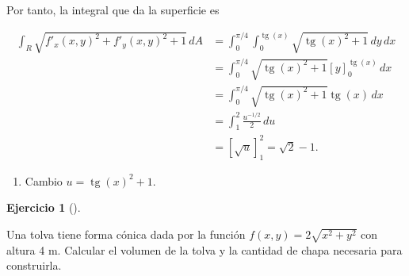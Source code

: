 \documentclass[
  a4paper,
]{scrreport}
\providecommand{\tightlist}{%
  \setlength{\itemsep}{0pt}\setlength{\parskip}{0pt}}\usepackage{longtable,booktabs,array}
\theoremstyle{definition}
\newtheorem{exercise}{Ejercicio}[chapter]
\theoremstyle{remark}
\begin{document}
\begin{tcolorbox}
\begin{enumerate}
  Por tanto, la integral que da la superficie es

  \begin{align*}
  \int_R \sqrt{f'_x(x,y)^2+f'_y(x,y)^2+1}\,dA
  &= \int_{0}^{\pi/4} \int_{0}^{\operatorname{tg}(x)} \sqrt{\operatorname{tg}(x)^2+1}\,dy\,dx \\
  &= \int_{0}^{\pi/4} \sqrt{\operatorname{tg}(x)^2+1}[y]_0^{\operatorname{tg}(x)}\,dx \\
  &= \int_{0}^{\pi/4} \sqrt{\operatorname{tg}(x)^2+1}\operatorname{tg}(x)\,dx \\
  &= \int_1^2 \frac{u^{-1/2}}{2}\,du \tag{1}\\
  &= [\sqrt{u}]_1^2 
  = \sqrt{2}-1.
  \end{align*}

  \begin{enumerate}
  \def\labelenumii{(\arabic{enumii})}
  \tightlist
  \item
    Cambio \(u=\operatorname{tg}(x)^2+1\).
  \end{enumerate}
\end{enumerate}

\end{tcolorbox}

\begin{exercise}[]\protect\hypertarget{exr-area-superficie-chimenea}{}\label{exr-area-superficie-chimenea}

Una tolva tiene forma cónica dada por la función
\(f(x,y)=2\sqrt{x^2+y^2}\) con altura 4 m. Calcular el volumen de la
tolva y la cantidad de chapa necesaria para construirla.

\end{exercise}
\end{document}
